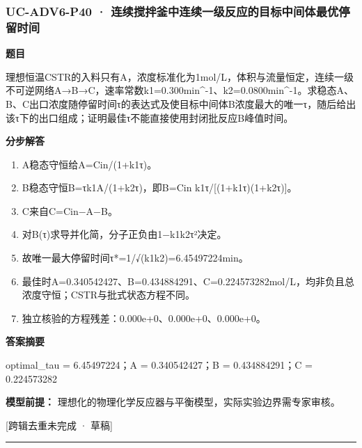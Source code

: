 \documentclass[UTF8,11pt,a4paper]{ctexart}
\begin{document}
\subsubsection*{UC-ADV6-P40 · 连续搅拌釜中连续一级反应的目标中间体最优停留时间}
\noindent\textbf{题目}\par
理想恒温CSTR的入料只有A，浓度标准化为1mol/L，体积与流量恒定，连续一级不可逆网络A→B→C，速率常数k1=0.300min\textasciicircum{}-1、k2=0.0800min\textasciicircum{}-1。求稳态A、B、C出口浓度随停留时间τ的表达式及使目标中间体B浓度最大的唯一τ，随后给出该τ下的出口组成；证明最佳τ不能直接使用封闭批反应B峰值时间。\par
\medskip\noindent\textbf{分步解答}
\begin{enumerate}
\item A稳态守恒给A=Cin/(1+k1τ)。
\item B稳态守恒B=τk1A/(1+k2τ)，即B=Cin k1τ/[(1+k1τ)(1+k2τ)]。
\item C来自C=Cin−A−B。
\item 对B(τ)求导并化简，分子正负由1−k1k2τ²决定。
\item 故唯一最大停留时间τ*=1/√(k1k2)=6.45497224min。
\item 最佳时A=0.340542427、B=0.434884291、C=0.224573282mol/L，均非负且总浓度守恒；CSTR与批式状态方程不同。
\item 独立核验的方程残差：0.000e+0、0.000e+0、0.000e+0。
\end{enumerate}
\noindent\textbf{答案摘要}\par
optimal\_tau = 6.45497224；A = 0.340542427；B = 0.434884291；C = 0.224573282\par
\noindent\textbf{模型前提：}
理想化的物理化学反应器与平衡模型，实际实验边界需专家审核。\par
\noindent\textcolor{red!65!black}{[跨辑去重未完成 · 草稿]} \par
\medskip\hrule\medskip
{}
\end{document}
